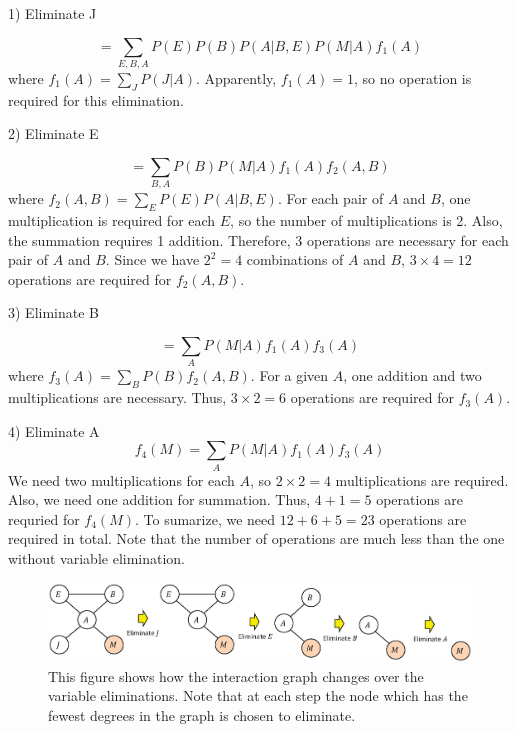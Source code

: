 \begin{enumerate}
\begin{enumerate}
1) Eliminate J

\[
=\sum_{E,B,A} P(E)P(B)P(A|B,E)P(M|A)f_1(A)
\]
where $f_1 (A)=\sum_J P(J|A)$. Apparently, $f_1 (A)=1$, so no operation is required for this elimination.

2) Eliminate E

\[
=\sum_{B,A} P(B)P(M|A) f_1 (A) f_2 (A,B)
\]
where $f_2 (A,B)=\sum_E P(E)P(A|B,E)$. For each pair of $A$ and $B$, one multiplication is required for each $E$, so the number of multiplications is 2. Also, the summation requires 1 addition. Therefore, 3 operations are necessary for each pair of $A$ and $B$. Since we have $2^2=4$ combinations of $A$ and $B$, $3 \times 4 = 12$ operations are required for $f_2 (A,B)$.

3) Eliminate B

\[
=\sum_{A} P(M|A) f_1 (A) f_3 (A)
\]
where $f_3 (A)=\sum_B P(B)f_2 (A,B)$. For a given $A$, one addition and two multiplications are necessary. Thus, $3 \times 2 = 6$ operations are required for $f_3 (A)$.

4) Eliminate A
\[
f_4 (M)=\sum_{A} P(M|A) f_1 (A) f_3 (A)
\]
We need two multiplications for each $A$, so $2 \times 2 = 4$ multiplications are required. Also, we need one addition for summation. Thus, $4 + 1 = 5$ operations are requried for $f_4 (M)$. To sumarize, we need $12 + 6 + 5 = 23$ operations are required in total. Note that the number of operations are much less than the one without variable elimination.

\begin{figure}[hbtp]
\centering
\includegraphics[width=160mm]{interaction_graph}
\caption{This figure shows how the interaction graph changes over the variable eliminations. Note that at each step the node which has the fewest degrees in the graph is chosen to eliminate.}
\label{fig:interaction_graph}
\end{figure}

\end{enumerate}


\end{enumerate}



